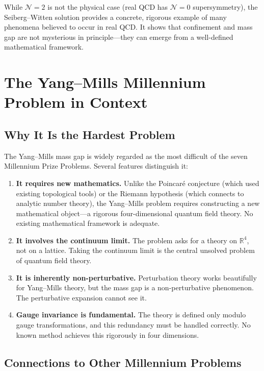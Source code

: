 While $\mathcal{N} = 2$ is not the physical case (real QCD has $\mathcal{N} = 0$ supersymmetry), the Seiberg--Witten solution provides a concrete, rigorous example of many phenomena believed to occur in real QCD. It shows that confinement and mass gap are not mysterious in principle---they can emerge from a well-defined mathematical framework.

\section{The Yang--Mills Millennium Problem in Context}

\subsection{Why It Is the Hardest Problem}

The Yang--Mills mass gap is widely regarded as the most difficult of the seven Millennium Prize Problems. Several features distinguish it:

\begin{enumerate}
  \item \textbf{It requires new mathematics.} Unlike the Poincar\'{e} conjecture (which used existing topological tools) or the Riemann hypothesis (which connects to analytic number theory), the Yang--Mills problem requires constructing a new mathematical object---a rigorous four-dimensional quantum field theory. No existing mathematical framework is adequate.

  \item \textbf{It involves the continuum limit.} The problem asks for a theory on $\mathbb{R}^4$, not on a lattice. Taking the continuum limit is the central unsolved problem of quantum field theory.

  \item \textbf{It is inherently non-perturbative.} Perturbation theory works beautifully for Yang--Mills theory, but the mass gap is a non-perturbative phenomenon. The perturbative expansion cannot see it.

  \item \textbf{Gauge invariance is fundamental.} The theory is defined only modulo gauge transformations, and this redundancy must be handled correctly. No known method achieves this rigorously in four dimensions.
\end{enumerate}

\subsection{Connections to Other Millennium Problems}

